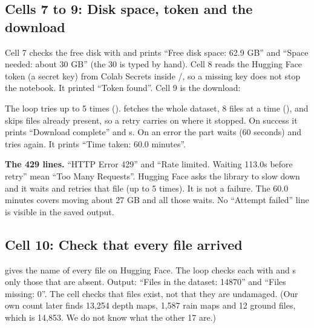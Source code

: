 \subsection{Cells 7 to 9: Disk space, token and the download}
Cell 7 checks the free disk with  and prints ``Free disk space: 62.9 GB'' and ``Space needed: about 30 GB'' (the 30 is typed by hand). Cell 8 reads the Hugging Face token (a secret key) from Colab Secrets inside /, so a missing key does not stop the notebook. It printed ``Token found''. Cell 9 is the download:

The loop tries up to 5 times ().  fetches the whole dataset, 8 files at a time (), and skips files already present, so a retry carries on where it stopped. On success it prints ``Download complete'' and s. On an error the  part waits  (60 seconds) and tries again. It prints ``Time taken: 60.0 minutes''.

\begin{carefulbox}
\textbf{The 429 lines.} ``HTTP Error 429'' and ``Rate limited. Waiting 113.0s before retry'' mean ``Too Many Requests''. Hugging Face asks the library to slow down and it waits and retries that file (up to 5 times). It is not a failure. The 60.0 minutes covers moving about 27 GB and all those waits. No ``Attempt failed'' line is visible in the saved output.
\end{carefulbox}

\subsection{Cell 10: Check that every file arrived}
 gives the name of every file on Hugging Face. The loop checks each with  and s only those that are absent. Output: ``Files in the dataset: 14870'' and ``Files missing: 0''. The cell checks that files exist, not that they are undamaged. (Our own count later finds 13,254 depth maps, 1,587 rain maps and 12 ground files, which is 14,853. We do not know what the other 17 are.)

